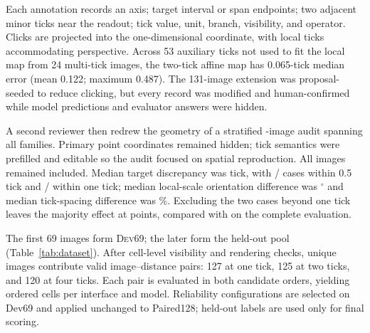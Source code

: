 Each annotation records an axis; target interval or span endpoints; two adjacent minor ticks near the readout; tick value, unit, branch, visibility, and operator. Clicks are projected into the one-dimensional coordinate, with local ticks accommodating perspective. Across 53 auxiliary ticks not used to fit the local map from 24 multi-tick images, the two-tick affine map has 0.065-tick median error (mean 0.122; maximum 0.487). The 131-image extension was proposal-seeded to reduce clicking, but every record was modified and human-confirmed while model predictions and evaluator answers were hidden.

A second reviewer then redrew the geometry of a stratified \GeometryAuditImages{}-image audit spanning all \GeometryAuditFamilies{} families. Primary point coordinates remained hidden; tick semantics were prefilled and editable so the audit focused on spatial reproduction. All \GeometryAuditImages{} images remained included. Median target discrepancy was \GeometryAuditTargetMedian{} tick, with \GeometryAuditWithinHalf{}/\GeometryAuditImages{} cases within 0.5 tick and \GeometryAuditWithinOne{}/\GeometryAuditImages{} within one tick; median local-scale orientation difference was \GeometryAuditAxisMedian$^{\circ}$ and median tick-spacing difference was \GeometryAuditTickSpacingMedianDelta\%. Excluding the two cases beyond one tick leaves the majority effect at \GeometryAuditSensitivityGain{} points, compared with \MajorityBalancedGain{} on the complete evaluation.

\begin{table}[t]
  \centering
  \caption{\dataset{} paired-test protocol. Every planned cell contributes one successfully parsed final response; retries preserve its cell ID, and no output is filtered by predicted choice.}
  \label{tab:dataset}
  \small
  \setlength{\tabcolsep}{8pt}
  
\end{table}

The first 69 images form \textsc{Dev69}; the later \HeldoutImages{} form the held-out pool (Table~\ref{tab:dataset}). After cell-level visibility and rendering checks, \PairedImages{} unique images contribute \ImageDistancePairs{} valid image--distance pairs: 127 at one tick, 125 at two ticks, and 120 at four ticks. Each pair is evaluated in both candidate orders, yielding \CallsPerInterface{} ordered cells per interface and model. Reliability configurations are selected on Dev69 and applied unchanged to Paired128; held-out labels are used only for final scoring.

